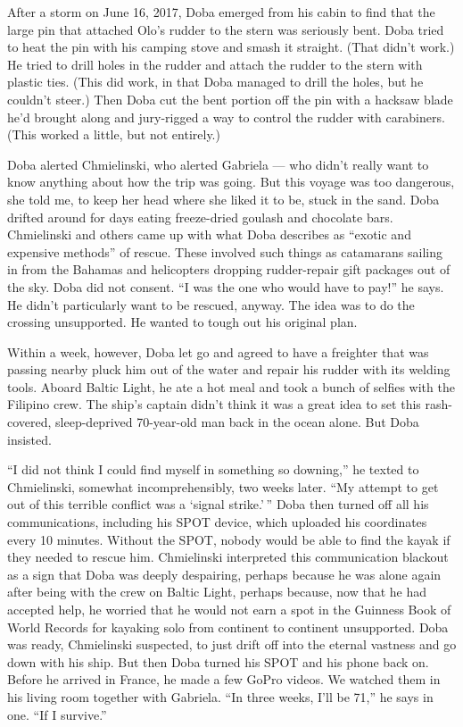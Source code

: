 After a storm on June 16, 2017, Doba emerged from his cabin to find that
the large pin that attached Olo's rudder to the stern was seriously
bent. Doba tried to heat the pin with his camping stove and smash it
straight. (That didn't work.) He tried to drill holes in the rudder and
attach the rudder to the stern with plastic ties. (This did work, in
that Doba managed to drill the holes, but he couldn't steer.) Then Doba
cut the bent portion off the pin with a hacksaw blade he'd brought along
and jury-rigged a way to control the rudder with carabiners. (This
worked a little, but not entirely.)

Doba alerted Chmielinski, who alerted Gabriela --- who didn't really
want to know anything about how the trip was going. But this voyage was
too dangerous, she told me, to keep her head where she liked it to be,
stuck in the sand. Doba drifted around for days eating freeze-dried
goulash and chocolate bars. Chmielinski and others came up with what
Doba describes as ``exotic and expensive methods'' of rescue. These
involved such things as catamarans sailing in from the Bahamas and
helicopters dropping rudder-repair gift packages out of the sky. Doba
did not consent. ``I was the one who would have to pay!'' he says. He
didn't particularly want to be rescued, anyway. The idea was to do the
crossing unsupported. He wanted to tough out his original plan.

Within a week, however, Doba let go and agreed to have a freighter that
was passing nearby pluck him out of the water and repair his rudder with
its welding tools. Aboard Baltic Light, he ate a hot meal and took a
bunch of selfies with the Filipino crew. The ship's captain didn't think
it was a great idea to set this rash-covered, sleep-deprived 70-year-old
man back in the ocean alone. But Doba insisted.

``I did not think I could find myself in something so downing,'' he
texted to Chmielinski, somewhat incomprehensibly, two weeks later. ``My
attempt to get out of this terrible conflict was a `signal strike.' ''
Doba then turned off all his communications, including his SPOT device,
which uploaded his coordinates every 10 minutes. Without the SPOT,
nobody would be able to find the kayak if they needed to rescue him.
Chmielinski interpreted this communication blackout as a sign that Doba
was deeply despairing, perhaps because he was alone again after being
with the crew on Baltic Light, perhaps because, now that he had accepted
help, he worried that he would not earn a spot in the Guinness Book of
World Records for kayaking solo from continent to continent unsupported.
Doba was ready, Chmielinski suspected, to just drift off into the
eternal vastness and go down with his ship. But then Doba turned his
SPOT and his phone back on. Before he arrived in France, he made a few
GoPro videos. We watched them in his living room together with Gabriela.
``In three weeks, I'll be 71,'' he says in one. ``If I survive.''

